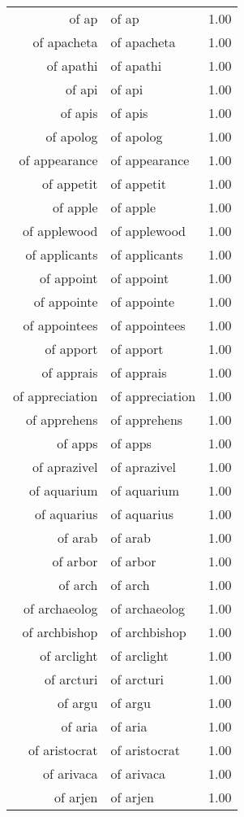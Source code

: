 \begin{table}[ht]
\begin{tabular}{rlr}
  of ap & of ap & 1.00 \\ 
  of apacheta & of apacheta & 1.00 \\ 
  of apathi & of apathi & 1.00 \\ 
  of api & of api & 1.00 \\ 
  of apis & of apis & 1.00 \\ 
  of apolog & of apolog & 1.00 \\ 
  of appearance & of appearance & 1.00 \\ 
  of appetit & of appetit & 1.00 \\ 
  of apple & of apple & 1.00 \\ 
  of applewood & of applewood & 1.00 \\ 
  of applicants & of applicants & 1.00 \\ 
  of appoint & of appoint & 1.00 \\ 
  of appointe & of appointe & 1.00 \\ 
  of appointees & of appointees & 1.00 \\ 
  of apport & of apport & 1.00 \\ 
  of apprais & of apprais & 1.00 \\ 
  of appreciation & of appreciation & 1.00 \\ 
  of apprehens & of apprehens & 1.00 \\ 
  of apps & of apps & 1.00 \\ 
  of aprazivel & of aprazivel & 1.00 \\ 
  of aquarium & of aquarium & 1.00 \\ 
  of aquarius & of aquarius & 1.00 \\ 
  of arab & of arab & 1.00 \\ 
  of arbor & of arbor & 1.00 \\ 
  of arch & of arch & 1.00 \\ 
  of archaeolog & of archaeolog & 1.00 \\ 
  of archbishop & of archbishop & 1.00 \\ 
  of arclight & of arclight & 1.00 \\ 
  of arcturi & of arcturi & 1.00 \\ 
  of argu & of argu & 1.00 \\ 
  of aria & of aria & 1.00 \\ 
  of aristocrat & of aristocrat & 1.00 \\ 
  of arivaca & of arivaca & 1.00 \\ 
  of arjen & of arjen & 1.00 \\ 

\end{tabular}
\end{table}
